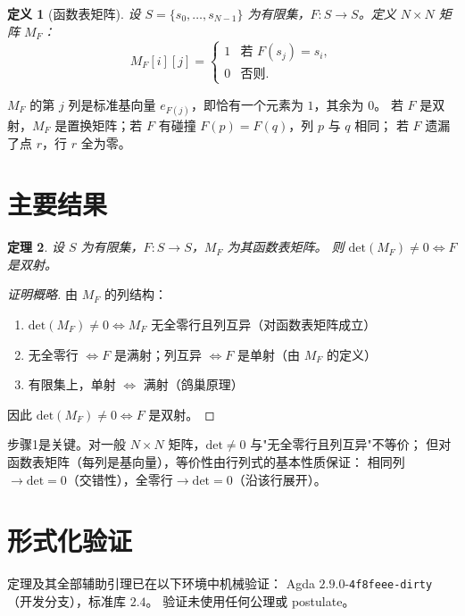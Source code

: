 \documentclass[a4paper,11pt]{article}
\newtheorem{theorem}{定理}[section]
\newtheorem{definition}[theorem]{定义}
\theoremstyle{remark}
\newcommand{\MF}{M_F}
\newcommand{\Det}{\mathrm{det}}
\begin{document}
\begin{definition}[函数表矩阵]
设 $S=\{s_0,\dots,s_{N-1}\}$ 为有限集，$F:S\to S$。定义 $N\times N$ 矩阵 $\MF$：
\[
\MF[i][j] = \begin{cases}
1 & \text{若 } F(s_j) = s_i,\\
0 & \text{否则}.
\end{cases}
\]
\end{definition}

$\MF$ 的第 $j$ 列是标准基向量 $e_{F(j)}$，即恰有一个元素为 $1$，其余为 $0$。
若 $F$ 是双射，$\MF$ 是置换矩阵；若 $F$ 有碰撞 $F(p)=F(q)$，列 $p$ 与 $q$ 相同；
若 $F$ 遗漏了点 $r$，行 $r$ 全为零。

\section{主要结果}

\begin{theorem}\label{thm:main}
设 $S$ 为有限集，$F:S\to S$，$\MF$ 为其函数表矩阵。
则 $\Det(\MF)\neq 0 \iff F$ 是双射。
\end{theorem}

\begin{proof}[证明概略]
由 $\MF$ 的列结构：
\begin{enumerate}
\item $\Det(\MF)\neq 0 \iff \MF$ 无全零行且列互异（对函数表矩阵成立）
\item 无全零行 $\iff F$ 是满射；列互异 $\iff F$ 是单射（由 $\MF$ 的定义）
\item 有限集上，单射 $\iff$ 满射（鸽巢原理）
\end{enumerate}
因此 $\Det(\MF)\neq 0 \iff F$ 是双射。
\end{proof}

步骤1是关键。对一般 $N\times N$ 矩阵，$\Det\neq0$ 与"无全零行且列互异"不等价；
但对函数表矩阵（每列是基向量），等价性由行列式的基本性质保证：
相同列$\to\Det=0$（交错性），全零行$\to\Det=0$（沿该行展开）。

\section{形式化验证}

定理及其全部辅助引理已在以下环境中机械验证：
Agda $2.9.0$-\texttt{4f8feee-dirty}（开发分支），标准库 $2.4$。
验证未使用任何公理或 postulate。
\end{document}

